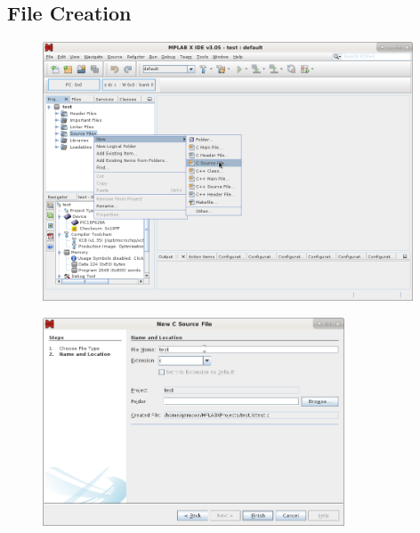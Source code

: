 \subsection{File Creation}

\begin{figure}[H]
\center
\includegraphics[width=0.98\textwidth]{img/hmd/mplab17.png} 
\end{figure} 

\begin{figure}[H]
\center
\includegraphics[width=0.8\textwidth]{img/hmd/mplab18.png} 
\end{figure} 


